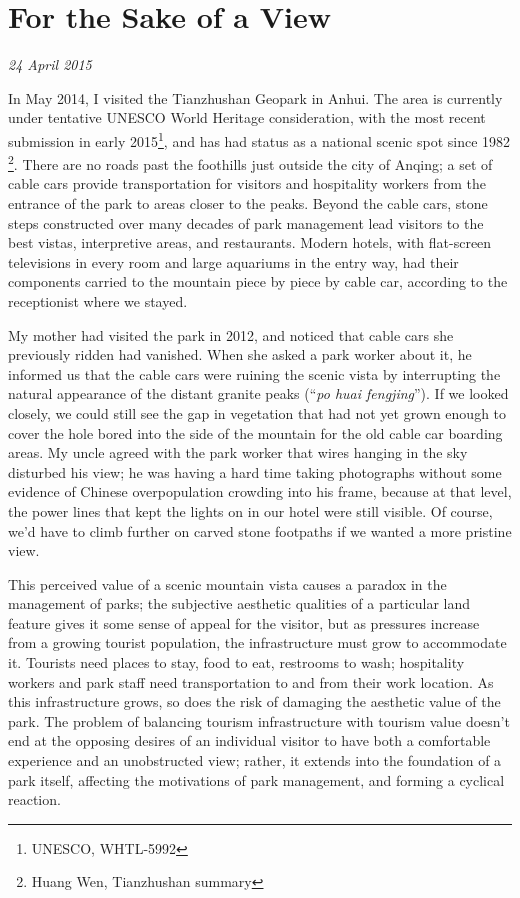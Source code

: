 \section{For the Sake of a View}

\textit{24 April 2015}

In May 2014, I visited the Tianzhushan Geopark in Anhui. The area is currently
under tentative UNESCO World Heritage consideration, with the most recent
submission in early 2015\footnote{UNESCO, WHTL-5992}, and has had status as a
national scenic spot since 1982 \footnote{Huang Wen, Tianzhushan summary}.
There are no roads past the foothills just outside the city of Anqing; a set of
cable cars provide transportation for visitors and hospitality workers from the
entrance of the park to areas closer to the peaks. Beyond the cable cars, stone
steps constructed over many decades of park management lead visitors to the best
vistas, interpretive areas, and restaurants. Modern hotels, with flat-screen
televisions in every room and large aquariums in the entry way, had their
components carried to the mountain piece by piece by cable car, according to the
receptionist where we stayed.

My mother had visited the park in 2012, and noticed that cable cars she
previously ridden had vanished. When she asked a park worker about it, he
informed us that the cable cars were ruining the scenic vista by interrupting
the natural appearance of the distant granite peaks (``\textit{po huai
fengjing}''). If we looked closely, we could still see the gap in vegetation
that had not yet grown enough to cover the hole bored into the side of the
mountain for the old cable car boarding areas. My uncle agreed with the park
worker that wires hanging in the sky disturbed his view; he was having a hard
time taking photographs without some evidence of Chinese overpopulation crowding
into his frame, because at that level, the power lines that kept the lights on
in our hotel were still visible. Of course, we'd have to climb further on carved
stone footpaths if we wanted a more pristine view.

This perceived value of a scenic mountain vista causes a paradox in the
management of parks; the subjective aesthetic qualities of a particular land
feature gives it some sense of appeal for the visitor, but as pressures increase
from a growing tourist population, the infrastructure must grow to accommodate
it. Tourists need places to stay, food to eat, restrooms to wash; hospitality
workers and park staff need transportation to and from their work location. As
this infrastructure grows, so does the risk of damaging the aesthetic value of
the park. The problem of balancing tourism infrastructure with
tourism value doesn't end at the opposing desires of an individual visitor to
have both a comfortable experience and an unobstructed view; rather, it extends
into the foundation of a park itself, affecting the motivations of park
management, and forming a cyclical reaction.

